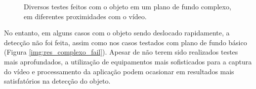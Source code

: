 \begin{figure}[H]
{		\label{img:res_complexo_mov1}
	}\hspace{3em}
	\hspace{3em}
	\caption{Diversos testes feitos com o objeto em um plano de fundo complexo, em diferentes proximidades com o vídeo.}
	\label{img:res_complexo}
\end{figure}

No entanto, em alguns casos com o objeto sendo deslocado rapidamente, a detecção não foi feita, assim como nos casos testados com plano de fundo básico (Figura \ref{img:res_complexo_fail}). Apesar de não terem sido realizados testes mais aprofundados, a utilização de equipamentos mais sofisticados para a captura do vídeo e processamento da aplicação podem ocasionar em resultados mais satisfatórios na detecção do objeto.

